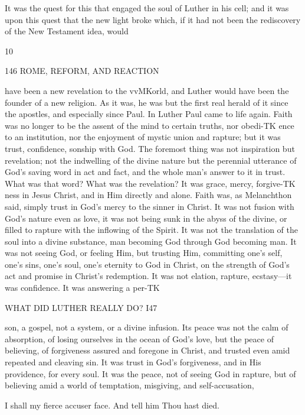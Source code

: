 \documentclass[12pt,a5paper,oneside]{book}
\begin{document}
{It was the quest for this that engaged the soul 
of Luther in his cell; and it was upon this quest 
that the new light broke which, if it had not been 
the rediscovery of the New Testament idea, would 

10 



146 ROME, REFORM, AND REACTION 

have been a new revelation to the vvMKorld, and Luther 
would have been the founder of a new religion. As 
it was, he was but the first real herald of it since 
the apostles, and especially since Paul. In Luther 
Paul came to life again. Faith was no longer to be 
the assent of the mind to certain truths, nor obedi-TK
ence to an institution, nor the enjoyment of mystic 
union and rapture; but it was trust, confidence, 
sonship with God. The foremost thing was not 
inspiration but revelation; not the indwelling of the 
divine nature but the perennial utterance of God's 
saving word in act and fact, and the whole man's 
answer to it in trust. What was that word? What 
was the revelation? It was grace, mercy, forgive-TK
ness in Jesus Christ, and in Him directly and alone. 
Faith was, as Melanchthon said, simply trust in God's 
mercy to the sinner in Christ. It was not fusion with 
God's nature even as love, it was not being sunk in 
the abyss of the divine, or filled to rapture with the 
inflowing of the Spirit. It was not the translation 
of the soul into a divine substance, man becoming 
God through God becoming man. It was not seeing 
God, or feeling Him, but trusting Him, committing 
one's self, one's sins, one's soul, one's eternity to God 
in Christ, on the strength of God's act and promise 
in Christ's redemption. It was not elation, rapture, 
ecstasy---it was confidence. It was answering a per-TK



WHAT DID LUTHER REALLY DO? I47 

son, a gospel, not a system, or a divine infusion. 
Its peace was not the calm of absorption, of losing 
ourselves in the ocean of God's love, but the peace 
of believing, of forgiveness assured and foregone in 
Christ, and trusted even amid repeated and cleaving 
sin. It was trust in God's forgiveness, and in His 
providence, for every soul. It was the peace, not of 
seeing God in rapture, but of believing amid a world 
of temptation, misgiving, and self-accusation, 

I shall my fierce accuser face. 
And tell him Thou hast died. 

}
\end{document}
